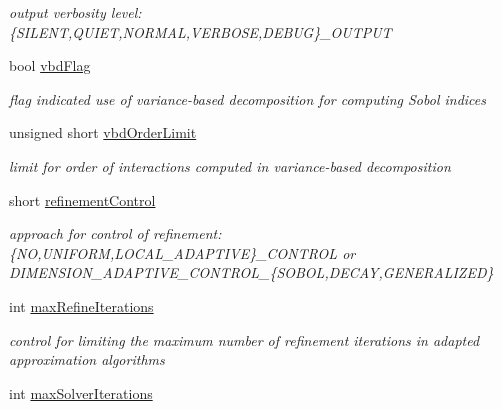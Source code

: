 \begin{DoxyCompactItemize}
\begin{DoxyCompactList}\small\item\em output verbosity level\+: \{S\+I\+L\+E\+NT,Q\+U\+I\+ET,N\+O\+R\+M\+AL,V\+E\+R\+B\+O\+SE,D\+E\+B\+UG\}\+\_\+\+O\+U\+T\+P\+UT \end{DoxyCompactList}\item 
bool \hyperlink{classPecos_1_1ExpansionConfigOptions_a7245a7ac6fed7086737a74de2d14e351}{vbd\+Flag}\label{classPecos_1_1ExpansionConfigOptions_a7245a7ac6fed7086737a74de2d14e351}

\begin{DoxyCompactList}\small\item\em flag indicated use of variance-\/based decomposition for computing Sobol\textquotesingle{} indices \end{DoxyCompactList}\item 
unsigned short \hyperlink{classPecos_1_1ExpansionConfigOptions_afc2fc7de610d61c8b26d7a539175e140}{vbd\+Order\+Limit}\label{classPecos_1_1ExpansionConfigOptions_afc2fc7de610d61c8b26d7a539175e140}

\begin{DoxyCompactList}\small\item\em limit for order of interactions computed in variance-\/based decomposition \end{DoxyCompactList}\item 
short \hyperlink{classPecos_1_1ExpansionConfigOptions_a220ded02774967c0e361d4f6707c47a1}{refinement\+Control}\label{classPecos_1_1ExpansionConfigOptions_a220ded02774967c0e361d4f6707c47a1}

\begin{DoxyCompactList}\small\item\em approach for control of refinement\+: \{NO,U\+N\+I\+F\+O\+RM,L\+O\+C\+A\+L\+\_\+\+A\+D\+A\+P\+T\+I\+VE\}\+\_\+\+C\+O\+N\+T\+R\+OL or D\+I\+M\+E\+N\+S\+I\+O\+N\+\_\+\+A\+D\+A\+P\+T\+I\+V\+E\+\_\+\+C\+O\+N\+T\+R\+O\+L\+\_\+\{S\+O\+B\+OL,D\+E\+C\+AY,G\+E\+N\+E\+R\+A\+L\+I\+Z\+ED\} \end{DoxyCompactList}\item 
int \hyperlink{classPecos_1_1ExpansionConfigOptions_a55b1d40dab6511038dfd557e0c4feb31}{max\+Refine\+Iterations}\label{classPecos_1_1ExpansionConfigOptions_a55b1d40dab6511038dfd557e0c4feb31}

\begin{DoxyCompactList}\small\item\em control for limiting the maximum number of refinement iterations in adapted approximation algorithms \end{DoxyCompactList}\item 
int \hyperlink{classPecos_1_1ExpansionConfigOptions_a8ed5aaf09f80b5da21ec21fda71eb25f}{max\+Solver\+Iterations}\label{classPecos_1_1ExpansionConfigOptions_a8ed5aaf09f80b5da21ec21fda71eb25f}


\end{DoxyCompactItemize}
